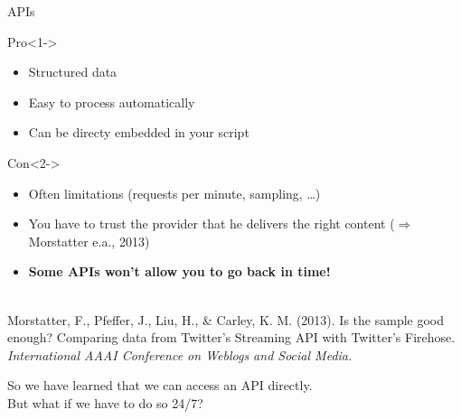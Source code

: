 \documentclass{beamer}
\begin{document}
\begin{frame}{APIs}
\begin{block}{Pro}<1->
\begin{itemize}
\item Structured data
\item Easy to process automatically
\item Can be directy embedded in your script
\end{itemize}
\end{block}
\begin{block}{Con}<2->
\begin{itemize}
\item Often limitations (requests per minute, sampling, \ldots)
\item You have to trust the provider that he delivers the right content {\footnotesize{($\Rightarrow$ Morstatter e.a., 2013)}}
\item {\textbf{Some APIs won't allow you to go back in time!}}
\end{itemize}
\end{block}
~\\
\tiny{Morstatter, F., Pfeffer, J., Liu, H., \& Carley, K. M. (2013). Is the sample good enough? Comparing data from Twitter’s Streaming API with Twitter’s Firehose. \emph{International AAAI Conference on Weblogs and Social Media.} \\}
\end{frame}




\begin{frame}
So we have learned that we can access an API directly. \\
But what if we have to do so 24/7?
\\~\\~\\

\end{frame}
\end{document}
